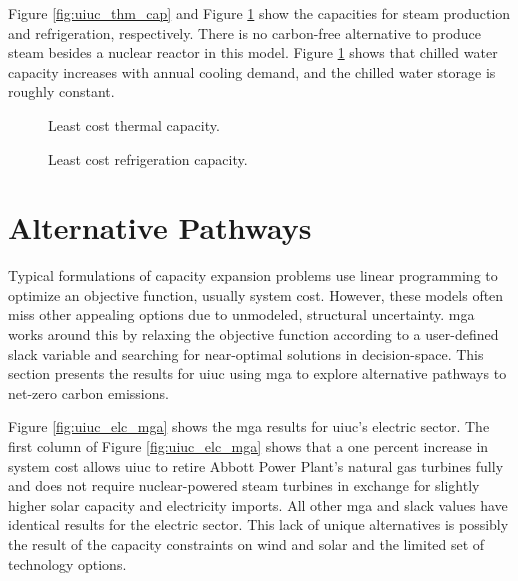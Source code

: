 Figure \ref{fig:uiuc_thm_cap} and Figure \ref{fig:uiuc_chw_cap} show the capacities
for steam production and refrigeration, respectively. There is no carbon-free
alternative to produce steam besides a nuclear reactor in this model. Figure
\ref{fig:uiuc_chw_cap} shows that chilled water capacity increases with annual
cooling demand, and the chilled water storage is roughly constant.

\begin{figure}[H]
  \begin{minipage}{0.48\textwidth}
    \captionsetup{type=figure}
    \centering
    \resizebox{\columnwidth}{!}{}
    \caption[]{Least cost thermal capacity.}
    \label{fig:uiuc_thm_cap}
  \end{minipage}
  \begin{minipage}{0.48\textwidth}
    \centering
    \resizebox{\columnwidth}{!}{}
    \caption[]{Least cost refrigeration capacity.}
    \label{fig:uiuc_chw_cap}
  \end{minipage}
\end{figure}

\section{Alternative Pathways}

Typical formulations of capacity expansion problems use linear programming to optimize
an objective function, usually system cost. However, these models often miss
other appealing options due to unmodeled, structural uncertainty. \gls{mga}
works around this by relaxing the objective function according to a user-defined
slack variable and searching for near-optimal solutions in decision-space. This
section presents the results for \gls{uiuc} using \gls{mga} to explore alternative
pathways to net-zero carbon emissions.

Figure \ref{fig:uiuc_elc_mga} shows the \gls{mga} results for \gls{uiuc}'s electric
sector. The first column of Figure \ref{fig:uiuc_elc_mga} shows that a one percent
increase in system cost allows \gls{uiuc} to retire Abbott Power Plant's
natural gas turbines fully and does not require nuclear-powered steam turbines
in exchange for slightly higher solar capacity and electricity imports. All other
\gls{mga} and slack values have identical results for the electric sector.
This lack of unique alternatives is possibly the result of the capacity constraints on
wind and solar and the limited set of technology options.

